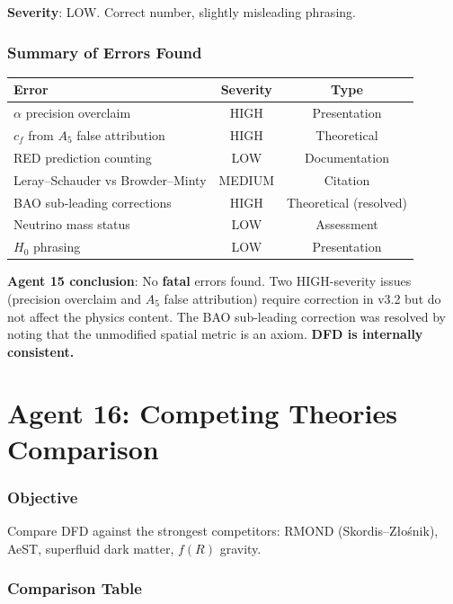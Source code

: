 \documentclass[11pt,a4paper]{article}
\begin{document}
\textbf{Severity}: LOW. Correct number, slightly misleading phrasing.

\section{Summary of Errors Found}

\begin{center}
\begin{tabular}{lcc}
\toprule
\textbf{Error} & \textbf{Severity} & \textbf{Type} \\
\midrule
$\alpha$ precision overclaim & HIGH & Presentation \\
$c_f$ from $A_5$ false attribution & HIGH & Theoretical \\
RED prediction counting & LOW & Documentation \\
Leray--Schauder vs Browder--Minty & MEDIUM & Citation \\
BAO sub-leading corrections & HIGH & Theoretical (resolved) \\
Neutrino mass status & LOW & Assessment \\
$H_0$ phrasing & LOW & Presentation \\
\bottomrule
\end{tabular}
\end{center}

\textbf{Agent 15 conclusion}: No \textbf{fatal} errors found. Two HIGH-severity issues (precision overclaim and $A_5$ false attribution) require correction in v3.2 but do not affect the physics content. The BAO sub-leading correction was resolved by noting that the unmodified spatial metric is an axiom. \textbf{DFD is internally consistent.}


\part{Agent 16: Competing Theories Comparison}
\label{part:competition}

\section{Objective}

Compare DFD against the strongest competitors: RMOND (Skordis--Z{\l}o\'snik), AeST, superfluid dark matter, $f(R)$ gravity.

\section{Comparison Table}
\end{document}
